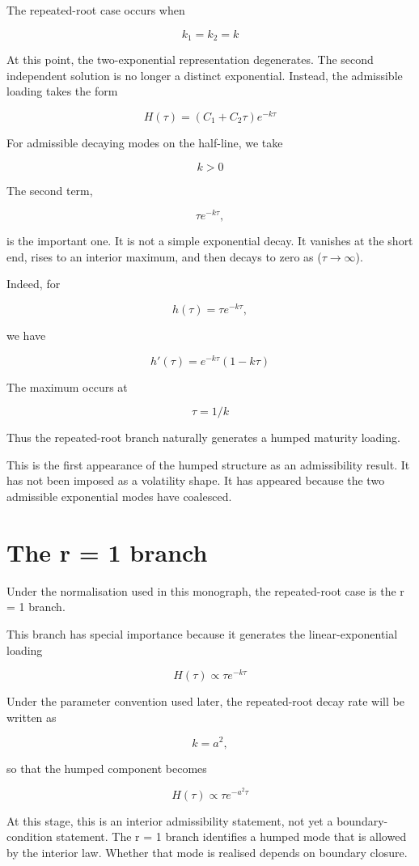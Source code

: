 \documentclass[11pt,oneside]{book}
\begin{document}
The repeated-root case occurs when

\[
k_1 = k_2 = k
\]

At this point, the two-exponential representation degenerates. The
second independent solution is no longer a distinct exponential.
Instead, the admissible loading takes the form

\[
H(\tau) = (C_1 + C_2\tau)e^{-k\tau}
\]

For admissible decaying modes on the half-line, we take

\[
k >{} 0
\]

The second term,

\[
\tau e^{-k\tau},
\]

is the important one. It is not a simple exponential decay. It vanishes
at the short end, rises to an interior maximum, and then decays to zero
as ($\tau\to\infty$).

Indeed, for

\[
h(\tau) = \tau e^{-k\tau},
\]

we have

\[
h'(\tau) = e^{-k\tau}(1 - k\tau)
\]

The maximum occurs at

\[
\tau = 1/k
\]

Thus the repeated-root branch naturally generates a humped maturity
loading.

This is the first appearance of the humped structure as an admissibility
result. It has not been imposed as a volatility shape. It has appeared
because the two admissible exponential modes have coalesced.

\section{The r = 1 branch}\label{the-r-1-branch}

Under the normalisation used in this monograph, the repeated-root case
is the r = 1 branch.

This branch has special importance because it generates the
linear-exponential loading

\[
H(\tau) \propto \tau e^{-k\tau}
\]

Under the parameter convention used later, the repeated-root decay rate
will be written as

\[
k = a^2,
\]

so that the humped component becomes

\[
H(\tau) \propto \tau e^{-a^2\tau}
\]

At this stage, this is an interior admissibility statement, not yet a
boundary-condition statement. The r = 1 branch identifies a humped mode
that is allowed by the interior law. Whether that mode is realised
depends on boundary closure.
\end{document}
